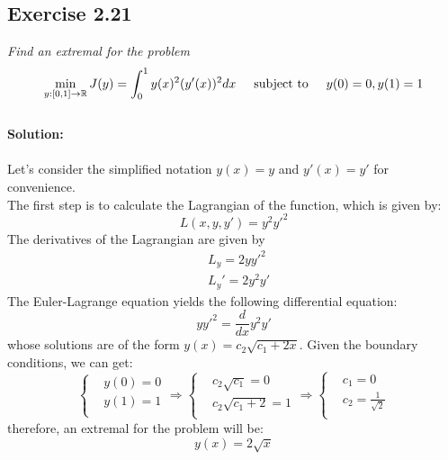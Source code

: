 \subsection{Exercise 2.21}
\emph{Find an extremal for the problem}
\begin{equation}
    \min\limits_{y:[0,1] \to \mathbb{R}} J(y) = \int_0^1 y(x)^2 (y'(x))^2 dx \hspace{0.5cm} \text{subject to}\hspace{0.5cm} y(0) = 0, y(1) = 1 
\end{equation}
\\
\textbf{Solution:}\\
\\
Let's consider the simplified notation $y(x) = y$ and $y'(x) = y'$ for convenience.\\
The first step is to calculate the Lagrangian of the function, which is given by:
\begin{equation}
    L(x, y, y') = y^2 y'^2
\end{equation}
The derivatives of the Lagrangian are given by
\begin{align}
    &L_y = 2yy'^2\\
    &L_y'= 2y^2y'
\end{align}
The Euler-Lagrange equation yields the following differential equation:
\begin{equation}
    yy'^2 = \frac{d}{dx} y^2 y'
\end{equation}
whose solutions are of the form $y(x) = c_2\sqrt{c_1 + 2x}$. Given the boundary conditions, we can get:
\begin{equation}
    \begin{cases}
    &y(0) = 0 \\
    &y(1) = 1 \\
    \end{cases}
    \Longrightarrow
    \begin{cases}
    &c_2\sqrt{c_1} = 0 \\
    &c_2\sqrt{c_1 + 2} = 1 \\
    \end{cases}
    \Longrightarrow
    \begin{cases}
    &c_1 = 0\\
    &c_2 = \frac{1}{\sqrt{2}}\\
    \end{cases}
\end{equation}
therefore, an extremal for the problem will be:
\begin{equation}
    y(x) = 2\sqrt{x}
\end{equation}
\QEDB





